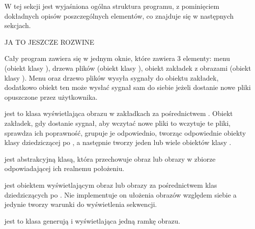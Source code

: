 
W tej sekcji jest wyjaśniona ogólna struktura programu, z pominięciem dokładnych opisów poszczególnych elementów, co znajduje się w następnych sekcjach.

JA TO JESZCZE ROZWINE
\par
Cały program zawiera się w jednym oknie, które zawiera 3 elementy: menu (obiekt klasy ), drzewa plików (obiekt klasy ), obiekt zakładek z obrazami (obiekt klasy ).
Menu oraz drzewo plików wysyła sygnały do obiektu zakładek, dodatkowo obiekt ten może wysłać sygnał sam do siebie jeżeli dostanie nowe pliki opuszczone przez użytkownika.
\par
{} jest to klasa wyświetlająca obrazu w zakładkach za pośrednictwem .
Obiekt zakładek, gdy dostanie sygnał, aby wczytać nowe pliki to wczytuje te pliki, sprawdza ich poprawność, grupuje je odpowiednio, tworząc odpowiednie obiekty klasy dziedziczącej po , a następnie tworzy jeden lub wiele obiektów klasy .
\par
{} jest abstrakcyjną klasą, która przechowuje obraz lub obrazy w zbiorze odpowiadającej ich realnemu położeniu.
\par
{} jest obiektem wyświetlającym obraz lub obrazy za pośrednictwem klas dziedziczących po .
Nie implementuje on ułożenia obrazów względem siebie a jedynie tworzy warunki do wyświetlenia sekwencji.
\par
{} jest to klasa generują i wyświetlająca jedną ramkę obrazu.

